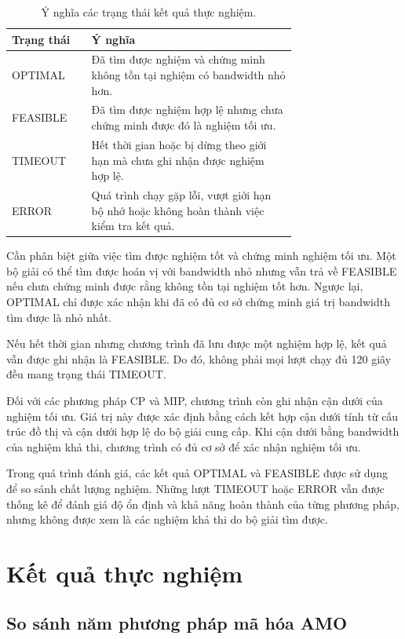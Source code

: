 \documentclass[a4paper,fleqn]{cas-sc}
\begin{document}
\begin{table}[pos=H]
\centering
\caption{Ý nghĩa các trạng thái kết quả thực nghiệm.}
\label{tab:solver-status}
\small
\begin{tabular}{lp{0.72\linewidth}}
\toprule
\textbf{Trạng thái} & \textbf{Ý nghĩa} \\
\midrule
OPTIMAL & Đã tìm được nghiệm và chứng minh không tồn tại nghiệm có bandwidth nhỏ hơn. \\
FEASIBLE & Đã tìm được nghiệm hợp lệ nhưng chưa chứng minh được đó là nghiệm tối ưu. \\
TIMEOUT & Hết thời gian hoặc bị dừng theo giới hạn mà chưa ghi nhận được nghiệm hợp lệ. \\
ERROR & Quá trình chạy gặp lỗi, vượt giới hạn bộ nhớ hoặc không hoàn thành việc kiểm tra kết quả. \\
\bottomrule
\end{tabular}
\end{table}

Cần phân biệt giữa việc tìm được nghiệm tốt và chứng minh nghiệm tối ưu. Một bộ giải có thể tìm được hoán vị với bandwidth nhỏ nhưng vẫn trả về FEASIBLE nếu chưa chứng minh được rằng không tồn tại nghiệm tốt hơn. Ngược lại, OPTIMAL chỉ được xác nhận khi đã có đủ cơ sở chứng minh giá trị bandwidth tìm được là nhỏ nhất.

Nếu hết thời gian nhưng chương trình đã lưu được một nghiệm hợp lệ, kết quả vẫn được ghi nhận là FEASIBLE. Do đó, không phải mọi lượt chạy đủ 120 giây đều mang trạng thái TIMEOUT.

Đối với các phương pháp CP và MIP, chương trình còn ghi nhận cận dưới của nghiệm tối ưu. Giá trị này được xác định bằng cách kết hợp cận dưới tính từ cấu trúc đồ thị và cận dưới hợp lệ do bộ giải cung cấp. Khi cận dưới bằng bandwidth của nghiệm khả thi, chương trình có đủ cơ sở để xác nhận nghiệm tối ưu.

Trong quá trình đánh giá, các kết quả OPTIMAL và FEASIBLE được sử dụng để so sánh chất lượng nghiệm. Những lượt TIMEOUT hoặc ERROR vẫn được thống kê để đánh giá độ ổn định và khả năng hoàn thành của từng phương pháp, nhưng không được xem là các nghiệm khả thi do bộ giải tìm được.


\section{Kết quả thực nghiệm}

\subsection{So sánh năm phương pháp mã hóa AMO}
\end{document}
